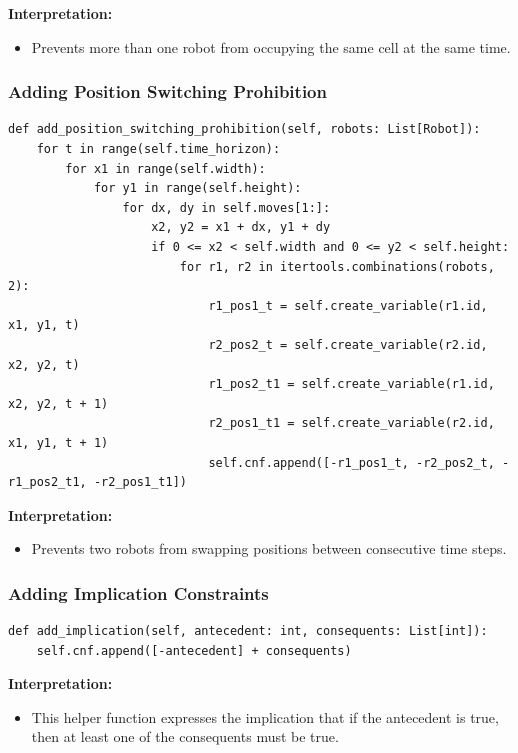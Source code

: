 \documentclass[8pt]{article}
\begin{document}
\textbf{Interpretation:}
\begin{itemize}
    \item Prevents more than one robot from occupying the same cell at the same time.
\end{itemize}

\subsubsection*{Adding Position Switching Prohibition}
\begin{lstlisting}
def add_position_switching_prohibition(self, robots: List[Robot]):
    for t in range(self.time_horizon):
        for x1 in range(self.width):
            for y1 in range(self.height):
                for dx, dy in self.moves[1:]:
                    x2, y2 = x1 + dx, y1 + dy
                    if 0 <= x2 < self.width and 0 <= y2 < self.height:
                        for r1, r2 in itertools.combinations(robots, 2):
                            r1_pos1_t = self.create_variable(r1.id, x1, y1, t)
                            r2_pos2_t = self.create_variable(r2.id, x2, y2, t)
                            r1_pos2_t1 = self.create_variable(r1.id, x2, y2, t + 1)
                            r2_pos1_t1 = self.create_variable(r2.id, x1, y1, t + 1)
                            self.cnf.append([-r1_pos1_t, -r2_pos2_t, -r1_pos2_t1, -r2_pos1_t1])
\end{lstlisting}

\textbf{Interpretation:}
\begin{itemize}
    \item Prevents two robots from swapping positions between consecutive time steps.
\end{itemize}

\subsubsection*{Adding Implication Constraints}
\begin{lstlisting}
def add_implication(self, antecedent: int, consequents: List[int]):
    self.cnf.append([-antecedent] + consequents)
\end{lstlisting}

\textbf{Interpretation:}
\begin{itemize}
    \item This helper function expresses the implication that if the antecedent is true, then at least one of the consequents must be true.
\end{itemize}
\end{document}
